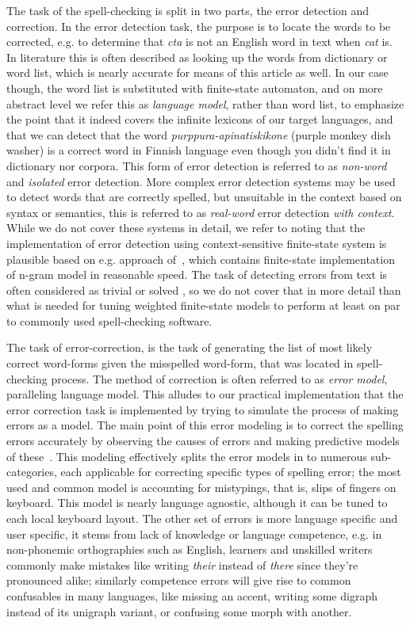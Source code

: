 \documentclass[a4paper,12pt]{article}
\begin{document}
The task of the spell-checking is split in two parts, the error detection and
correction. In the error detection task, the purpose is to locate the words to
be corrected, e.g. to determine that \emph{cta} is not an English word in text
when \emph{cat} is. In literature this is often described as looking up the
words from dictionary or word list, which is nearly accurate for means of this
article as well. In our case though, the word list is substituted with
finite-state automaton, and on more abstract level we refer this as
\emph{language model}, rather than word list, to emphasize the point that it
indeed covers the infinite lexicons of our target languages, and that we can
detect that the word \emph{purppura-apinatiskikone} (purple monkey dish washer)
is a correct word in Finnish language even though you didn't find it in
dictionary nor corpora.  This form of error detection is referred to as
\emph{non-word} and \emph{isolated} error detection. More complex error
detection systems may be used to detect words that are correctly spelled, but
unsuitable in the context based on syntax or semantics, this is referred to as
\emph{real-word} error detection \emph{with context}. While we do not cover
these systems in detail, we refer to \cite{mays/1991} noting that the
implementation of error detection using context-sensitive finite-state system
is plausible based on e.g. approach of~\cite{silfverberg/2010}, which contains
finite-state implementation of n-gram model in reasonable speed. The task of
detecting errors from text is often considered as trivial or solved
\cite[e.g.][]{otero/2007}, so we do not cover that in more detail than what is
needed for tuning weighted finite-state models to perform at least on par to
commonly used spell-checking software.

The task of error-correction, is the task of generating the list of most likely
correct word-forms given the misspelled word-form, that was located in
spell-checking process. The method of correction is often referred to as
\emph{error model}, paralleling language model. This alludes to our practical
implementation that the error correction task is implemented by trying to
simulate the process of making errors as a model. The main point of this error
modeling is to correct the spelling errors accurately by observing the causes
of errors and making predictive models of
these~\cite[]{deorowicz2005correcting}.  This modeling effectively splits the
error models in to numerous sub-categories, each applicable for correcting
specific types of spelling error; the most used and common model is accounting
for mistypings, that is, slips of fingers on keyboard. This model is nearly
language agnostic, although it can be tuned to each local keyboard layout. The
other set of errors is more language specific and user specific, it stems from
lack of knowledge or language competence, e.g.  in non-phonemic orthographies
such as English, learners and unskilled writers commonly make mistakes like
writing \emph{their} instead of \emph{there} since they're pronounced alike;
similarly competence errors will give rise to common confusables in many
languages, like missing an accent, writing some digraph instead of its unigraph
variant, or confusing some morph with another.
\end{document}
